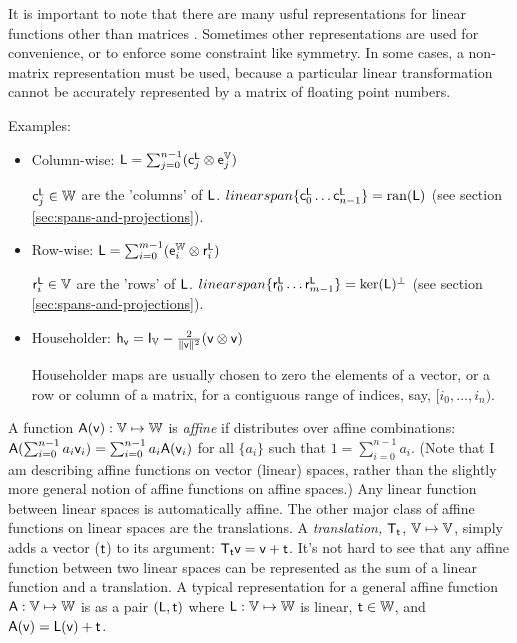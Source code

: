 It is important to note that there are many usful
representations for linear functions other than matrices \cite{mcdonald-1989b}.
Sometimes other representations are used for convenience,
or to enforce some constraint like symmetry.
In some cases, a non-matrix representation must be used,
because a particular linear transformation
cannot be accurately represented by a matrix of floating point numbers.

Examples:

\begin{itemize}

\item Column-wise:
$\mathsf{L} = \sum_{j=0}^{n-1} ( \mathsf{c}_j^{\mathsf{L}} \otimes \mathsf{e}_j^{\mathbb{V}} )$

$\mathsf{c}_j^{\mathsf{L}} \in \mathbb{W}$ are the 'columns' of $\mathsf{L}$.
$\\linearspan\{ \mathsf{c}_0^{\mathsf{L}} \ldots \mathsf{c}_{n-1}^{\mathsf{L}} \} = \mathrm{ran}(\mathsf{L})$
(see section \ref{sec:spans-and-projections}).

\item Row-wise:
$\mathsf{L} = \sum_{i=0}^{m-1} ( \mathsf{e}_i^{\mathbb{W}} \otimes  \mathsf{r}_i^{\mathsf{L}} )$

$\mathsf{r}_i^{\mathsf{L}} \in \mathbb{V}$ are the 'rows' of $\mathsf{L}$.
$\\linearspan\{ \mathsf{r}_0^{\mathsf{L}} \ldots \mathsf{r}_{m-1}^{\mathsf{L}} \} =  \mathrm{ker}(\mathsf{L})^{\perp}$
(see section \ref{sec:spans-and-projections}).

\item Householder:
$\mathsf{h}_{\mathsf{v}} = \mathsf{I}_{\mathbb{V}} - \frac{2}{\| \mathsf{v} \|^2} (\mathsf{v} \otimes \mathsf{v})$

Householder maps are usually chosen to zero the elements of
a vector, or a row or column of a matrix, for a contiguous range of
indices, say, $[i_0,\ldots,i_n)$.

\end {itemize}

\label{sec:affine-functions}

A function $\mathsf{A}(\mathsf{v}):\mathbb{V} \mapsto \mathbb{W}$
is \textit{affine} if distributes over affine combinations:
$\mathsf{A}(\sum_{i=0}^{n-1} a_i \mathsf{v}_i) = \sum_{i=0}^{n-1} a_i \mathsf{A}(\mathsf{v}_i) $
for all $\{a_i\}$ such that $1 = \sum_{i=0}^{n-1} a_i$.
(Note that I am describing affine functions on vector (linear) spaces,
rather than the slightly more general notion of affine functions on affine spaces.)
Any linear function between linear spaces is automatically affine.
The other major class of affine functions on linear spaces are the translations.
A \textit{translation,} $\mathsf{T}_{\mathsf{t}}$, $\mathbb{V} \mapsto \mathbb{V}$,
simply adds a vector ($\mathsf{t}$) to its argument:
$\mathsf{T}_{\mathsf{t}} \mathsf{v} = \mathsf{v} + \mathsf{t}$.
It's not hard to see that any affine function between two linear spaces
can be represented as the sum of a linear function and a translation.
A typical representation for a general affine function $\mathsf{A} : \mathbb{V} \mapsto \mathbb{W}$
is as a pair $(\mathsf{L},\mathsf{t})$ where $\mathsf{L} : \mathbb{V} \mapsto \mathbb{W}$ is linear,
$\mathsf{t} \in \mathbb{W}$, and $\mathsf{A}(\mathsf{v}) = \mathsf{L}(\mathsf{v}) + \mathsf{t}$.

